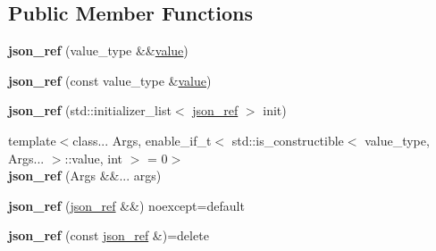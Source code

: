 \subsection*{Public Member Functions}
\begin{DoxyCompactItemize}
\item 
\mbox{\label{classnlohmann_1_1detail_1_1json__ref_ae1adf5bcee8b6fa0c358710604fb1938}} 
{\bfseries json\+\_\+ref} (value\+\_\+type \&\&\hyperlink{namespacenlohmann_1_1detail_a59e696b1dad6d0d99c172ac4518c2042a2063c1608d6e0baf80249c42e2be5804}{value})
\item 
\mbox{\label{classnlohmann_1_1detail_1_1json__ref_a8c3eb3c6e952ed0cd7eece586ab4047c}} 
{\bfseries json\+\_\+ref} (const value\+\_\+type \&\hyperlink{namespacenlohmann_1_1detail_a59e696b1dad6d0d99c172ac4518c2042a2063c1608d6e0baf80249c42e2be5804}{value})
\item 
\mbox{\label{classnlohmann_1_1detail_1_1json__ref_adfba2db547283a7c6a5df9a32e72efc5}} 
{\bfseries json\+\_\+ref} (std\+::initializer\+\_\+list$<$ \hyperlink{classnlohmann_1_1detail_1_1json__ref}{json\+\_\+ref} $>$ init)
\item 
\mbox{\label{classnlohmann_1_1detail_1_1json__ref_a8a31d6c588d6c3c06b62008fd5d36c6c}} 
{\footnotesize template$<$class... Args, enable\+\_\+if\+\_\+t$<$ std\+::is\+\_\+constructible$<$ value\+\_\+type, Args... $>$\+::value, int $>$  = 0$>$ }\\{\bfseries json\+\_\+ref} (Args \&\&... args)
\item 
\mbox{\label{classnlohmann_1_1detail_1_1json__ref_a4ec90f097b33e7ea8ea7473b6b6c4015}} 
{\bfseries json\+\_\+ref} (\hyperlink{classnlohmann_1_1detail_1_1json__ref}{json\+\_\+ref} \&\&) noexcept=default
\item 
\mbox{\label{classnlohmann_1_1detail_1_1json__ref_a4c68db46934e03588bbd73b00147c0dd}} 
{\bfseries json\+\_\+ref} (const \hyperlink{classnlohmann_1_1detail_1_1json__ref}{json\+\_\+ref} \&)=delete
\item 
\mbox{\label{classnlohmann_1_1detail_1_1json__ref_a98956ba676b1ae16b62346f9c4fb752e}} 

\end{DoxyCompactItemize}
